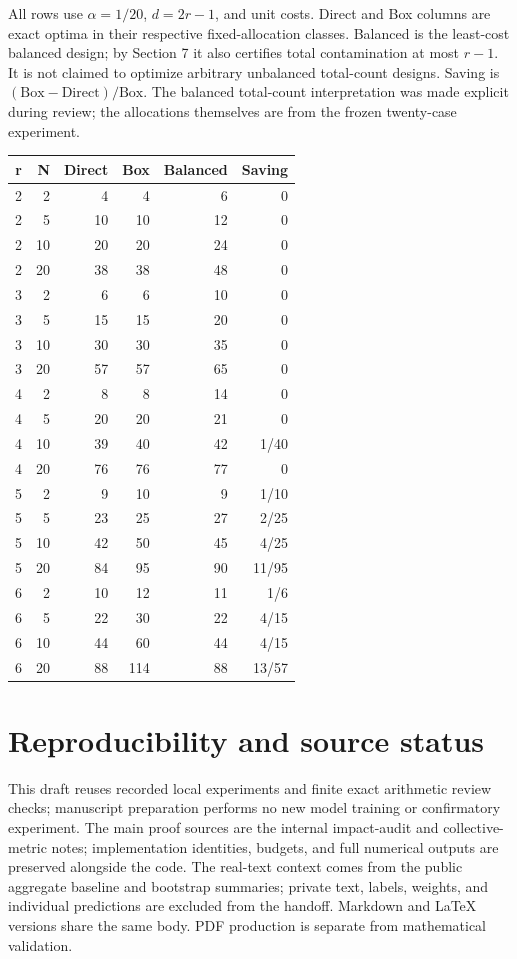 \documentclass[11pt]{article}
\begin{document}
All rows use $\alpha=1/20$, $d=2r-1$, and unit costs. Direct and Box columns are exact optima in their respective fixed-allocation classes. Balanced is the least-cost balanced design; by Section 7 it also certifies total contamination at most $r-1$. It is not claimed to optimize arbitrary unbalanced total-count designs. Saving is $(\text{Box}-\text{Direct})/\text{Box}$. The balanced total-count interpretation was made explicit during review; the allocations themselves are from the frozen twenty-case experiment.

\begin{center}
\begin{tabular}{@{}rrrrrr@{}}
\toprule
r & N & Direct & Box & Balanced & Saving \\
\midrule
2 & 2 & 4 & 4 & 6 & 0 \\
2 & 5 & 10 & 10 & 12 & 0 \\
2 & 10 & 20 & 20 & 24 & 0 \\
2 & 20 & 38 & 38 & 48 & 0 \\
3 & 2 & 6 & 6 & 10 & 0 \\
3 & 5 & 15 & 15 & 20 & 0 \\
3 & 10 & 30 & 30 & 35 & 0 \\
3 & 20 & 57 & 57 & 65 & 0 \\
4 & 2 & 8 & 8 & 14 & 0 \\
4 & 5 & 20 & 20 & 21 & 0 \\
4 & 10 & 39 & 40 & 42 & 1/40 \\
4 & 20 & 76 & 76 & 77 & 0 \\
5 & 2 & 9 & 10 & 9 & 1/10 \\
5 & 5 & 23 & 25 & 27 & 2/25 \\
5 & 10 & 42 & 50 & 45 & 4/25 \\
5 & 20 & 84 & 95 & 90 & 11/95 \\
6 & 2 & 10 & 12 & 11 & 1/6 \\
6 & 5 & 22 & 30 & 22 & 4/15 \\
6 & 10 & 44 & 60 & 44 & 4/15 \\
6 & 20 & 88 & 114 & 88 & 13/57 \\
\bottomrule
\end{tabular}
\end{center}

\section*{Reproducibility and source status}

This draft reuses recorded local experiments and finite exact arithmetic review checks; manuscript preparation performs no new model training or confirmatory experiment. The main proof sources are the internal impact-audit and collective-metric notes; implementation identities, budgets, and full numerical outputs are preserved alongside the code. The real-text context comes from the public aggregate baseline and bootstrap summaries; private text, labels, weights, and individual predictions are excluded from the handoff. Markdown and LaTeX versions share the same body. PDF production is separate from mathematical validation.
\end{document}
